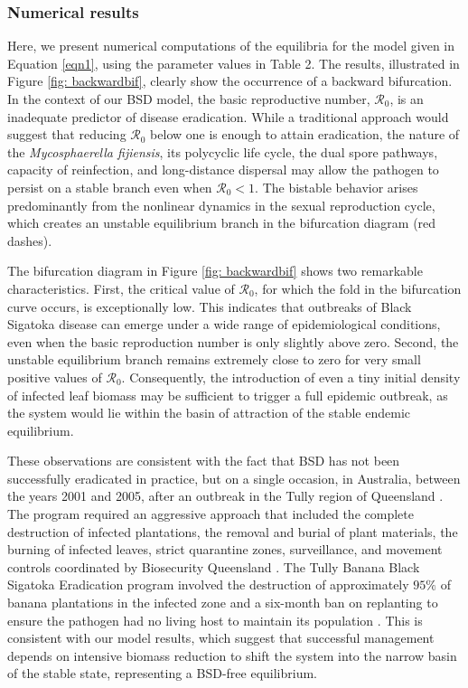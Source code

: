 \documentclass[11pt]{article}
\numberwithin{equation}{section}
\begin{document}
\subsubsection{Numerical results}
Here, we present numerical computations of the equilibria for the model given in Equation \eqref{eqn1}, using the parameter values in Table 2. The results, illustrated in Figure \ref{fig: backwardbif}, clearly show the occurrence of a backward bifurcation. 
In the context of our BSD model, the basic reproductive number, $\mathcal{R}_0$, is an inadequate predictor of disease eradication. While a traditional approach would suggest that reducing $\mathcal{R}_0$ below one is enough to attain eradication, the nature of the \textit{Mycosphaerella fijiensis}, its polycyclic life cycle, the dual spore pathways, capacity of reinfection, and long-distance dispersal may allow the pathogen to persist on a stable branch even when $\mathcal{R}_0<1$. 
The bistable behavior arises predominantly from the nonlinear dynamics in the sexual reproduction cycle, which creates an unstable equilibrium branch in the bifurcation diagram (red dashes).

The bifurcation diagram in Figure \ref{fig: backwardbif} shows two remarkable characteristics. First, the critical value of $\mathcal{R}_0$, for which the fold in the bifurcation curve occurs, is exceptionally low. This indicates that outbreaks of Black Sigatoka disease can emerge under a wide range of epidemiological conditions, even when the basic reproduction number is only slightly above zero. Second, the unstable equilibrium branch remains extremely close to zero for very small positive values of $\mathcal{R}_0$. Consequently, the introduction of even a tiny initial density of infected leaf biomass may be sufficient to trigger a full epidemic outbreak, as the system would lie within the basin of attraction of the stable endemic equilibrium.

These observations are consistent with the fact that BSD has not been successfully eradicated in practice, but on a single occasion, in Australia, between the years 2001 and 2005, after an outbreak in the Tully region of Queensland \cite{peterson, cook}. The program required an aggressive approach that included the complete destruction of infected plantations, the removal and burial of plant materials, the burning of infected leaves, strict quarantine zones, surveillance, and movement controls coordinated by Biosecurity Queensland \cite{henderson, sosnowski}. The Tully Banana Black Sigatoka Eradication program involved the destruction of approximately $95\%$ of banana plantations in the infected zone and a six-month ban on replanting to ensure the pathogen had no living host to maintain its population \cite{henderson}. 
This is consistent with our model results, which suggest that successful management depends on intensive biomass reduction to shift the system into the narrow basin of the stable state, representing a BSD-free equilibrium.
\end{document}
